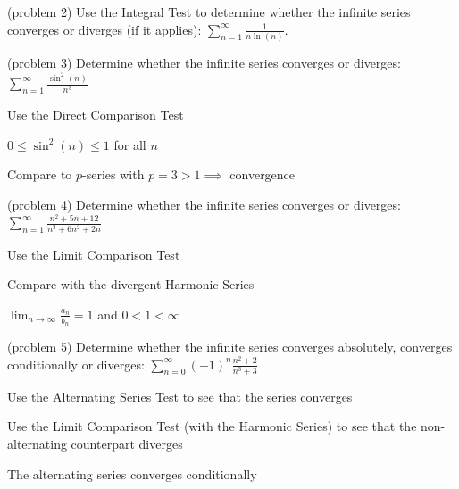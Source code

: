 \documentclass[handout]{ximera}
\begin{document}
\begin{problem}(problem 2)
Use the Integral Test to determine whether the infinite series converges or diverges (if it applies):
$\displaystyle \sum_{n=1}^\infty \frac{1}{n\ln(n)}$.
\end{problem}


\begin{problem}(problem 3)
Determine whether the infinite series converges or diverges: 
$\displaystyle \sum_{n=1}^\infty \frac{\sin^2(n)}{n^3}$

\begin{hint}
Use the Direct Comparison Test
\end{hint}

\begin{hint}
$\displaystyle 0 \leq \sin^2(n) \leq 1$ for all $n$
\end{hint}

\begin{hint}
Compare to $p$-series with $p = 3 > 1 \implies$ convergence
\end{hint}

\end{problem}

\begin{problem}(problem 4)
Determine whether the infinite series converges or diverges: 
$\displaystyle \sum_{n=1}^\infty \frac{n^2 + 5n + 12}{n^3 + 6n^2 + 2n}$
\begin{hint}
Use the Limit Comparison Test 
\end{hint}

\begin{hint}
Compare with the divergent Harmonic Series 
\end{hint}

\begin{hint}
$\displaystyle \lim_{n \to \infty} \frac{a_n}{b_n} = 1$ and $ 0 < 1 < \infty$
\end{hint}

\end{problem}

\begin{problem}(problem 5)
Determine whether the infinite series converges absolutely, converges conditionally or diverges: $\displaystyle \sum_{n=0}^\infty (-1)^n \frac{n^2 + 2}{n^3 + 3}$

\begin{hint}
Use the Alternating Series Test to see that the series converges
\end{hint}

\begin{hint}
Use the Limit Comparison Test (with the Harmonic Series) to see that the 
non-alternating counterpart diverges
\end{hint}

\begin{hint}
The alternating series converges conditionally
\end{hint}

\end{problem}
\end{document}

